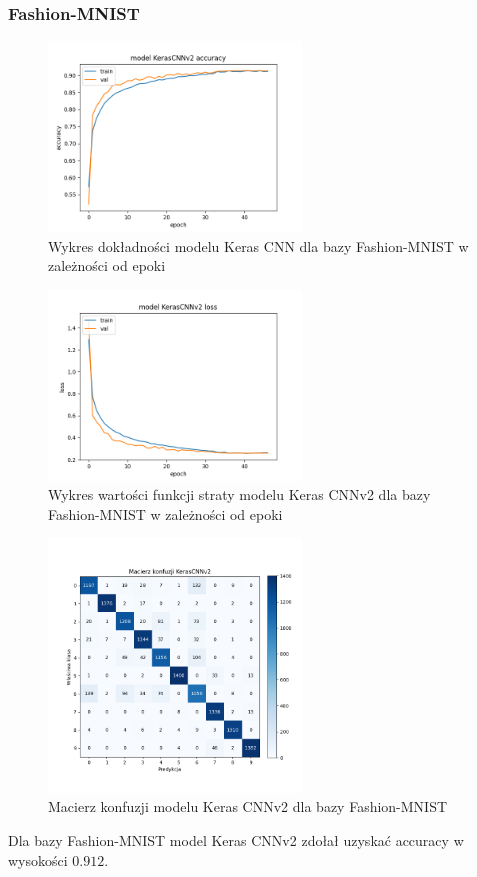 \documentclass{article}
\begin{document}
\subsubsection{Fashion-MNIST}
\begin{figure}[H]
    \centering
    \includegraphics[width=0.6\textwidth]{../Saves/KerasCNNV2/fashion-mnist/KerasCNNV2_fashion-mnist_ep47_acc.png}
    \caption{Wykres dokładności modelu Keras CNN dla bazy Fashion-MNIST w zależności od epoki}
\end{figure}

\begin{figure}[H]
    \centering
    \includegraphics[width=0.6\textwidth]{../Saves/KerasCNNV2/fashion-mnist/KerasCNNV2_fashion-mnist_ep47_loss.png}
    \caption{Wykres wartości funkcji straty modelu Keras CNNv2 dla bazy Fashion-MNIST w zależności od epoki}
\end{figure}

\begin{figure}[H]
	\centering
	\includegraphics[width=0.6\textwidth]{../Saves/KerasCNNV2/fashion-mnist/KerasCNNV2_fashion-mnist_conf_mat.png}
	\caption{Macierz konfuzji modelu Keras CNNv2 dla bazy Fashion-MNIST}
\end{figure}
Dla bazy Fashion-MNIST model Keras CNNv2 zdołał uzyskać accuracy w wysokości $0.912$.
\end{document}

